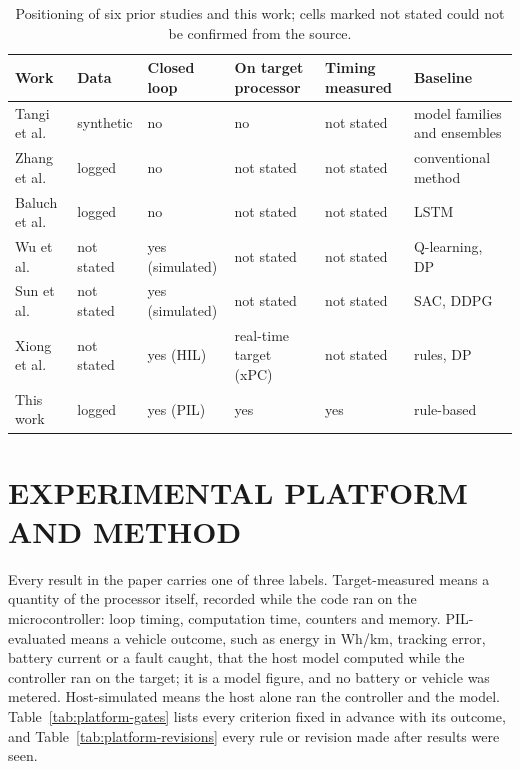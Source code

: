 \documentclass{ieeeaccess}
\begin{document}
\begin{table}[!t]
\centering
\caption{Positioning of six prior studies and this work; cells marked not stated could not be confirmed from the source.}
\label{tab:related-positioning}
\footnotesize
\setlength{\tabcolsep}{3pt}
\renewcommand{\arraystretch}{1.15}
\begin{tabularx}{\textwidth}{@{}XXXXXX@{}}
\hline
\textbf{Work} & \textbf{Data} & \textbf{Closed loop} & \textbf{On target processor} & \textbf{Timing measured} & \textbf{Baseline} \\
\hline
Tangi et al.~\cite{tangi2025} & synthetic & no & no & not stated & model families and ensembles \\
Zhang et al.~\cite{zhang2020} & logged & no & not stated & not stated & conventional method \\
Baluch et al.~\cite{baluch2026} & logged & no & not stated & not stated & LSTM \\
Wu et al.~\cite{wu2018} & not stated & yes (simulated) & not stated & not stated & Q-learning, DP \\
Sun et al.~\cite{sun2022} & not stated & yes (simulated) & not stated & not stated & SAC, DDPG \\
Xiong et al.~\cite{xiong2018} & not stated & yes (HIL) & real-time target (xPC) & not stated & rules, DP \\
This work & logged & yes (PIL) & yes & yes & rule-based \\
\hline
\end{tabularx}
\end{table}

\section{EXPERIMENTAL PLATFORM AND METHOD}
\label{sec:platform}

Every result in the paper carries one of three labels. Target-measured means a quantity of the processor itself, recorded while the code ran on the microcontroller: loop timing, computation time, counters and memory. PIL-evaluated means a vehicle outcome, such as energy in Wh/km, tracking error, battery current or a fault caught, that the host model computed while the controller ran on the target; it is a model figure, and no battery or vehicle was metered. Host-simulated means the host alone ran the controller and the model. Table~\ref{tab:platform-gates} lists every criterion fixed in advance with its outcome, and Table~\ref{tab:platform-revisions} every rule or revision made after results were seen.
\end{document}
